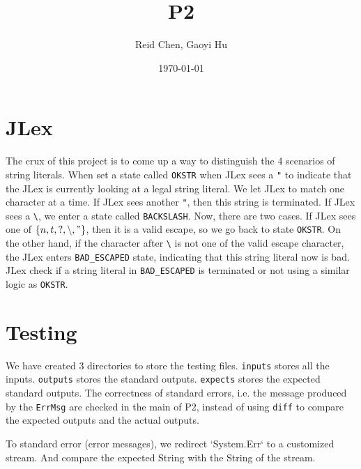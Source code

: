\documentclass[11pt]{article}
\author{Reid Chen, Gaoyi Hu}
\date{\today}
\title{P2}
\begin{document}
\maketitle
\tableofcontents


\section{JLex}
\label{sec:org26c5035}
The crux of this project is to come up a way to distinguish the 4 scenarios of
string literals. When set a state called \texttt{OKSTR} when JLex sees a \texttt{"} to indicate that the JLex is
currently looking at a legal string literal. We let JLex to match one
character at a time. If JLex sees another \texttt{"}, then this string is
terminated. If JLex sees a \texttt{\textbackslash{}}, we enter a state called \texttt{BACKSLASH}. Now,
there are two cases. If JLex sees one of \(\{n, t, ?, \backslash, "\}\), then it is a
valid escape, so we go back to state \texttt{OKSTR}. On the other hand, if the
character after \texttt{\textbackslash{}} is not one of the valid escape character, the JLex enters
\texttt{BAD\_ESCAPED} state, indicating that this string literal now is bad. JLex
check if a string literal in \texttt{BAD\_ESCAPED} is terminated or not using a
similar logic as \texttt{OKSTR}.
\section{Testing}
\label{sec:org118d62b}
We have created 3 directories to store the testing files. \texttt{inputs} stores all
the inputs. \texttt{outputs} stores the standard outputs. \texttt{expects} stores the
expected standard outputs. The correctness of standard errors, i.e. the
message produced by the \texttt{ErrMsg} are checked in the main of P2, instead of
using \texttt{diff} to compare the expected outputs and the actual outputs.

To standard error (error messages), we redirect `System.Err` to a customized
stream. And compare the expected String with the String of the stream.
\end{document}
